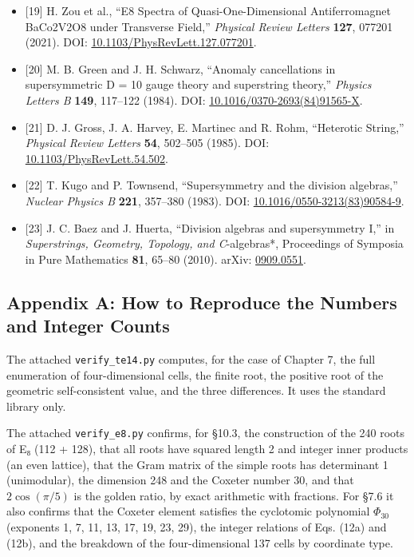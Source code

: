 \documentclass[
  a4paper,
]{article}
\begin{document}
\begin{itemize}
  Experimental Evidence for Emergent E8 Symmetry,'' \emph{Science}
  \textbf{327}, 177--180 (2010). DOI:
  \href{https://doi.org/10.1126/science.1180085}{10.1126/science.1180085}.
\item
  {[}19{]} H. Zou et al., ``E8 Spectra of Quasi-One-Dimensional
  Antiferromagnet BaCo2V2O8 under Transverse Field,'' \emph{Physical
  Review Letters} \textbf{127}, 077201 (2021). DOI:
  \href{https://doi.org/10.1103/PhysRevLett.127.077201}{10.1103/PhysRevLett.127.077201}.
\item
  {[}20{]} M. B. Green and J. H. Schwarz, ``Anomaly cancellations in
  supersymmetric D = 10 gauge theory and superstring theory,''
  \emph{Physics Letters B} \textbf{149}, 117--122 (1984). DOI:
  \href{https://doi.org/10.1016/0370-2693(84)91565-X}{10.1016/0370-2693(84)91565-X}.
\item
  {[}21{]} D. J. Gross, J. A. Harvey, E. Martinec and R. Rohm,
  ``Heterotic String,'' \emph{Physical Review Letters} \textbf{54},
  502--505 (1985). DOI:
  \href{https://doi.org/10.1103/PhysRevLett.54.502}{10.1103/PhysRevLett.54.502}.
\item
  {[}22{]} T. Kugo and P. Townsend, ``Supersymmetry and the division
  algebras,'' \emph{Nuclear Physics B} \textbf{221}, 357--380 (1983).
  DOI:
  \href{https://doi.org/10.1016/0550-3213(83)90584-9}{10.1016/0550-3213(83)90584-9}.
\item
  {[}23{]} J. C. Baez and J. Huerta, ``Division algebras and
  supersymmetry I,'' in \emph{Superstrings, Geometry, Topology, and
  C}-algebras*, Proceedings of Symposia in Pure Mathematics \textbf{81},
  65--80 (2010). arXiv:
  \href{https://arxiv.org/abs/0909.0551}{0909.0551}.
\end{itemize}

\subsection{Appendix A: How to Reproduce the Numbers and Integer
Counts}\label{appendix-a-how-to-reproduce-the-numbers-and-integer-counts}

The attached \texttt{verify\_\allowbreak{}te14.py} computes, for the case of Chapter
7, the full enumeration of four-dimensional cells, the finite root, the
positive root of the geometric self-consistent value, and the three
differences. It uses the standard library only.

The attached \texttt{verify\_\allowbreak{}e8.py} confirms, for §10.3, the
construction of the 240 roots of E₈ (112 + 128), that all roots have
squared length 2 and integer inner products (an even lattice), that the
Gram matrix of the simple roots has determinant 1 (unimodular), the
dimension 248 and the Coxeter number 30, and that \(2\cos(\pi/5)\) is
the golden ratio, by exact arithmetic with fractions. For §7.6 it also
confirms that the Coxeter element satisfies the cyclotomic polynomial
\(\Phi_{30}\) (exponents 1, 7, 11, 13, 17, 19, 23, 29), the integer
relations of Eqs. (12a) and (12b), and the breakdown of the
four-dimensional 137 cells by coordinate type.
\end{document}
